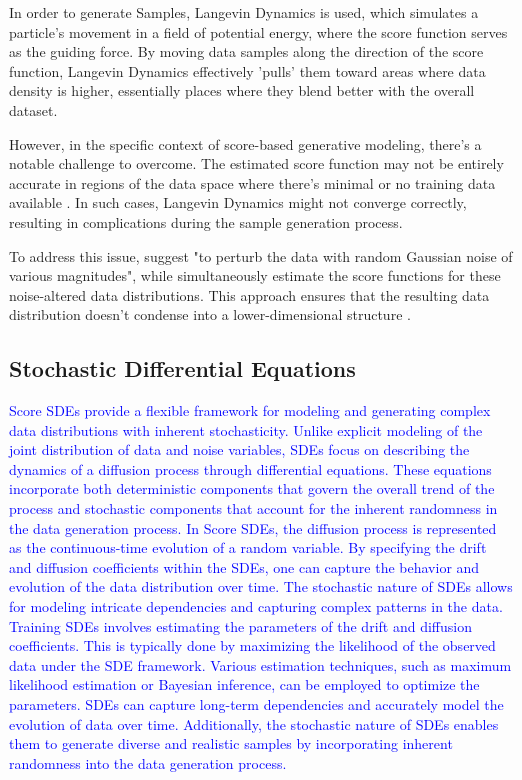 In order to generate Samples, Langevin Dynamics \citep{robertsLangevin} is used, which simulates a particle's movement in a field of potential energy, where the score function serves as the guiding force. By moving data samples along the direction of the score function, Langevin Dynamics effectively 'pulls' them toward areas where data density is higher, essentially places where they blend better with the overall dataset.

However, in the specific context of score-based generative modeling, there's a notable challenge to overcome. The estimated score function may not be entirely accurate in regions of the data space where there's minimal or no training data available \citep{song2019SGM}. In such cases, Langevin Dynamics might not converge correctly, resulting in complications during the sample generation process. 

To address this issue, \cite{song2019SGM} suggest "to perturb the data with random Gaussian noise of various magnitudes", while simultaneously estimate the score functions for these noise-altered data distributions. This approach ensures that the resulting data distribution doesn't condense into a lower-dimensional structure \citep{song2019SGM}.






\subsection{Stochastic Differential Equations}
\textcolor{blue}{Score SDEs provide a flexible framework for modeling and generating complex data distributions with inherent stochasticity. Unlike explicit modeling of the joint distribution of data and noise variables, SDEs focus on describing the dynamics of a diffusion process through differential equations. These equations incorporate both deterministic components that govern the overall trend of the process and stochastic components that account for the inherent randomness in the data generation process.
In Score SDEs, the diffusion process is represented as the continuous-time evolution of a random variable. By specifying the drift and diffusion coefficients within the SDEs, one can capture the behavior and evolution of the data distribution over time. The stochastic nature of SDEs allows for modeling intricate dependencies and capturing complex patterns in the data.
Training SDEs involves estimating the parameters of the drift and diffusion coefficients. This is typically done by maximizing the likelihood of the observed data under the SDE framework. Various estimation techniques, such as maximum likelihood estimation or Bayesian inference, can be employed to optimize the parameters.
SDEs can capture long-term dependencies and accurately model the evolution of data over time. Additionally, the stochastic nature of SDEs enables them to generate diverse and realistic samples by incorporating inherent randomness into the data generation process.}








